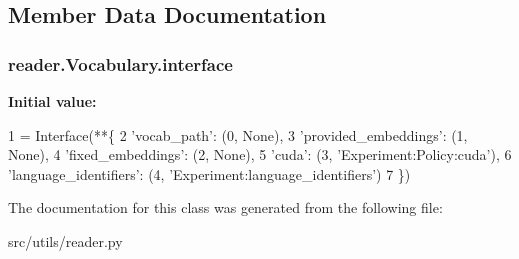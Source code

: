 \subsection{Member Data Documentation}
\subsubsection[{\texorpdfstring{interface}{interface}}]{\setlength{\rightskip}{0pt plus 5cm}reader.\+Vocabulary.\+interface\hspace{0.3cm}{\ttfamily [static]}}\hypertarget{classreader_1_1Vocabulary_a4e3b985c3eac1e55b385031b8c0463be}{}\label{classreader_1_1Vocabulary_a4e3b985c3eac1e55b385031b8c0463be}
{\bfseries Initial value\+:}
\begin{DoxyCode}
1 = Interface(**\{
2         \textcolor{stringliteral}{'vocab\_path'}:            (0, \textcolor{keywordtype}{None}),
3         \textcolor{stringliteral}{'provided\_embeddings'}:   (1, \textcolor{keywordtype}{None}),
4         \textcolor{stringliteral}{'fixed\_embeddings'}:      (2, \textcolor{keywordtype}{None}),
5         \textcolor{stringliteral}{'cuda'}:                  (3, \textcolor{stringliteral}{'Experiment:Policy:cuda'}),
6         \textcolor{stringliteral}{'language\_identifiers'}:  (4, \textcolor{stringliteral}{'Experiment:language\_identifiers'})
7     \})
\end{DoxyCode}


The documentation for this class was generated from the following file\+:\begin{DoxyCompactItemize}
\item 
src/utils/reader.\+py\end{DoxyCompactItemize}
